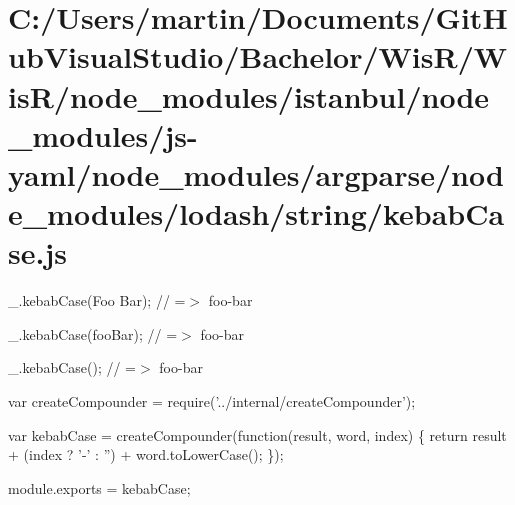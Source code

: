 \hypertarget{_c_1_2_users_2martin_2_documents_2_git_hub_visual_studio_2_bachelor_2_wis_r_2_wis_r_2node_modulebef9863078a16b98c79d2b0e5f9b178f}{}\section{C\+:/\+Users/martin/\+Documents/\+Git\+Hub\+Visual\+Studio/\+Bachelor/\+Wis\+R/\+Wis\+R/node\+\_\+modules/istanbul/node\+\_\+modules/js-\/yaml/node\+\_\+modules/argparse/node\+\_\+modules/lodash/string/kebab\+Case.\+js}
\+\_\+.\+kebab\+Case(\textquotesingle{}Foo Bar\textquotesingle{}); // =$>$ \textquotesingle{}foo-\/bar\textquotesingle{}

\+\_\+.\+kebab\+Case(\textquotesingle{}foo\+Bar\textquotesingle{}); // =$>$ \textquotesingle{}foo-\/bar\textquotesingle{}

\+\_\+.\+kebab\+Case(\textquotesingle{}); // =$>$ \textquotesingle{}foo-\/bar\textquotesingle{}


\begin{DoxyCodeInclude}
var createCompounder = require(\textcolor{stringliteral}{'../internal/createCompounder'});

var kebabCase = createCompounder(\textcolor{keyword}{function}(result, word, index) \{
  \textcolor{keywordflow}{return} result + (index ? \textcolor{charliteral}{'-'} : \textcolor{stringliteral}{''}) + word.toLowerCase();
\});

module.exports = kebabCase;
\end{DoxyCodeInclude}
 